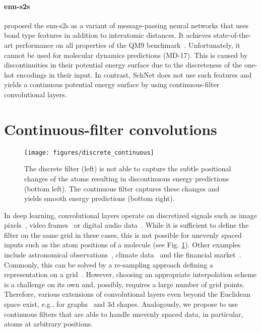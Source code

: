\documentclass{article}
\begin{document}
\paragraph*{enn-s2s} \citet{gilmer2017neural} proposed the enn-s2s as a variant of message-passing neural networks that uses bond type features in addition to interatomic distances.
It achieves state-of-the-art performance on all properties of the QM9 benchmark~\citep{gilmer2017neural}.
Unfortunately, it cannot be used for molecular dynamics predictions (MD-17).
This is caused by discontinuities in their potential energy surface due to the discreteness of the one-hot encodings in their input. 
In contrast, SchNet does not use such features and yields a continuous potential energy surface by using continuous-filter convolutional layers.

\section{Continuous-filter convolutions}
\begin{figure}
\centering
\texttt{[image: figures/discrete\_continuous]}
\caption{The discrete filter (left) is not able to capture the subtle positional changes of the atoms resulting in discontinuous energy predictions  (bottom left). The continuous filter captures these changes and yields smooth energy predictions (bottom right).}
\label{fig:discrete}
\end{figure}
In deep learning, convolutional layers operate on discretized signals such as image pixels~\citep{lecun1989backpropagation, krizhevsky2012imagenet}, video frames~\citep{karpathy2014large} or digital audio data~\citep{van2016wavenet}.
While it is sufficient to define the filter on the same grid in these cases, this is not possible for unevenly spaced inputs such as the atom positions of a molecule (see Fig. \ref{fig:discrete}).
Other examples include astronomical observations~\citep{max2014method}, climate data~\citep{olafsdottir2016redfit} and the financial market~\citep{nieto2015bayesian}.
Commonly, this can be solved by a re-sampling approach defining a representation on a grid~\citep{snyder2012finding,hirn2017wavelet,brockherde2017bypassing}.
However, choosing an appropriate interpolation scheme is a challenge on its own and, possibly, requires a large number of grid points.
Therefore, various extensions of convolutional layers even beyond the Euclidean space exist, e.g., for graphs~\citep{BrunaZSL13,HenaffBL15} and 3d shapes\citep{masci2015geodesic}.
Analogously, we propose to use continuous filters that are able to handle unevenly spaced data, in particular, atoms at arbitrary positions.
\end{document}
